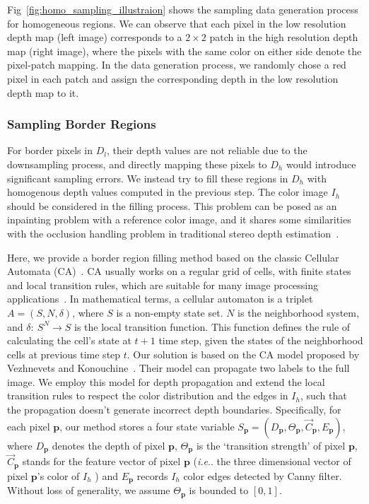 \documentclass[preprint,10pt,5p,times,twocolumn]{elsarticle}
\makeatletter
\DeclareRobustCommand\onedot{\futurelet\@let@token\@onedot}
\def\@onedot{\ifx\@let@token.\else.\null\fi\xspace}
\def\ie{\emph{i.e}\onedot} \def\Ie{\emph{I.e}\onedot}
\makeatother
\begin{document}
Fig~\ref{fig:homo_sampling_illustraion} shows the sampling data generation process for homogeneous regions. We can observe that each pixel in the low resolution depth map (left image) corresponds to a $2 \times 2$ patch in the high resolution depth map (right image), where the pixels with the same color on either side denote the pixel-patch mapping. In the data generation process, we randomly chose a red pixel in each patch and assign the corresponding depth in the low resolution depth map to it.

\subsubsection{Sampling Border Regions}
\label{chap:samplingdata2}

For border pixels in $D_{l}$, their depth values are not reliable due to the downsampling process, and directly mapping these pixels to $D_{h}$ would introduce significant sampling errors. We instead try to fill these regions in $D_{h}$ with homogenous depth values computed in the previous step. The color image $I_{h}$ should be considered in the filling process. This problem can be posed as an inpainting problem with a reference color image, and it shares some similarities with the occlusion handling problem in traditional stereo depth estimation~\cite{WJYG08}.

Here, we provide a border region filling method based on the classic Cellular Automata (CA)~\cite{Neumann66}. CA usually works on a regular grid of cells, with finite states and local transition rules, which are suitable for many image processing applications~\cite{PP02}. In mathematical terms, a cellular automaton is a triplet $A = (S, N, \delta)$, where $S$ is a non-empty state set. $N$ is the neighborhood system, and $\delta: \ S^{N} \longrightarrow S$ is the local transition function. This function defines the rule of calculating the cell's state at $t+1$ time step, given the states of the neighborhood cells at previous time step $t$.
Our solution is based on the CA model proposed by Vezhnevets and Konouchine~\cite{VK05}. Their model can propagate two labels to the full image. We employ this model for depth propagation and extend the local transition rules to respect the color distribution and the edges in $I_{h}$, such that the propagation doesn't generate incorrect depth boundaries. Specifically, for each pixel $\mathbf{p}$, our method stores a four state variable $S_{\mathbf{p}}=(D_{\mathbf{p}}, \Theta_{\mathbf{p}}, \overrightarrow{C}_{\mathbf{p}},E_{\mathbf{p}})$, where $D_{\mathbf{p}}$ denotes the depth of pixel $\mathbf{p}$, $\Theta_{\mathbf{p}}$ is the `transition strength' of pixel $\mathbf{p}$, $\overrightarrow{C}_{\mathbf{p}}$ stands for the feature vector of pixel $\mathbf{p}$ (\ie the three dimensional vector of pixel $\mathbf{p}$'s color of $I_{h}$ ) and $E_{\mathbf{p}}$ records $I_{h}$ color edges detected by Canny filter. Without loss of generality, we assume $\Theta_{\mathbf{p}}$ is bounded to $[0,1]$.
\end{document}
